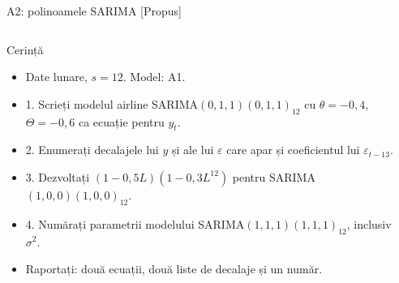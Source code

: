 \begin{frame}{A2: polinoamele SARIMA [Propus]}
\propsub
\itemsize{\scriptsize}
\begin{columns}[T]
\begin{column}{\taskw}
\begin{block}{Cerință}
\begin{itemize}
    \item Date lunare, $s = 12$. Model: A1.
    \item 1. Scrieți modelul airline SARIMA$(0,1,1)(0,1,1)_{12}$ cu $\theta = -0{,}4$, $\Theta = -0{,}6$ ca ecuație pentru $y_t$.
    \item 2. Enumerați decalajele lui $y$ și ale lui $\varepsilon$ care apar și coeficientul lui $\varepsilon_{t-13}$.
    \item 3. Dezvoltați $(1 - 0{,}5L)(1 - 0{,}3L^{12})$ pentru SARIMA$(1,0,0)(1,0,0)_{12}$.
    \item 4. Numărați parametrii modelului SARIMA$(1,1,1)(1,1,1)_{12}$, inclusiv $\sigma^2$.
    \item Raportați: două ecuații, două liste de decalaje și un număr.
\end{itemize}
\end{block}
\end{column}
\begin{column}{\solw}
\end{column}
\end{columns}
\end{frame}

